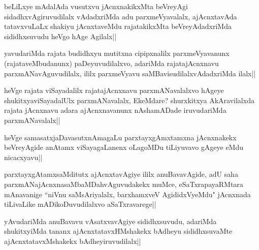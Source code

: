 \begin{artha}
beLiLxye mAdalAda vusutxvu jAcnxnakikxMta beVreyAgi sidadhxvAgiruvudilalx vAdadxriMda adu parxmeVyavalalx, ajAcnxtavAda tatavxvuLaLx shakiyu jAcnxtaveMdu rajatakikxMta beVreyAdadxriMda sididhxsuvudu heVgo hAge Agilalx||
\end{artha}

\begin{artha}
yavudariMda rajata budidhxyu mutitxna cipipxnalilx parxmeVyavanunx (rajataveMbudanunx) paDeyuvudilalxvo, adariMda rajatajAcnxnavu parxmANavAguvudilalx, ililx parxmeVyavu saMBavisudilalxvAdadxriMda ilalx||
\end{artha}

\begin{artha}
heVge rajata viSayadalilx rajatajAcnxnavu parxmANavalalxvo hAgeye shukitxyaviSayadalUlx parxmANavalalx, EkeMdare? shurxkitxya AkAravilalxda rajata jAcnxnavu adara ajAcnxnavanunx nAshamADade iruvudariMda parxmANavalalx||
\end{artha}


\begin{artha}
heVge samasatxjaDavasutxnAmagaLu parxtayxgAmxtamxna jAcnxnakekx beVreyAgide anAtamx viSayagaLanenx oLagoMDu tiLiyuvavo gAgeye eMdu nicacxyavu||
\end{artha}

\begin{artha}
parxtayxgAtamxsaMditutx ajAcnxtavAgiye ililx anuBavavAgide, adU saha parxmANajAcnxnasaMbaMDahvAguvudakekx muMce, eSaTxrapayaRMtara mAnavanige ``niVnu saMsAriyalalx, barxhamxveV AgididxVyeMdu" jAcnxnada tiLivaLike mADikoDuvudilalxvo aSaTxravarege||
\end{artha}


\begin{artha}
yAvudariMda anuBavavu vAsatxvavAgiye sididhxsuvudu, adariMda shukitxyiMda tananx ajAcnxtatavxHMshakekx bAdheyu sididhxsuvaMte ajAcnxtatavxMshakekx bAdheyiruvudilalx||
\end{artha}

